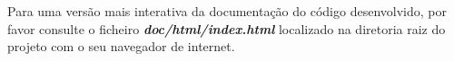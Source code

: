 \documentclass[a4paper,11pt]{scrreprt}
\begin{document}
%


    \quad Para uma versão mais interativa da documentação do código desenvolvido, por favor consulte o
    ficheiro \textbf{\textit{doc/html/index.html}} localizado na diretoria raiz do projeto com o seu
    navegador de internet.


\end{document}
